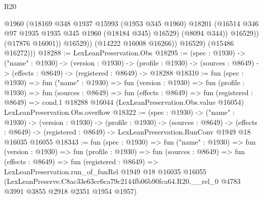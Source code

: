 \begin{lexlean}{R20}
\begin{coremodule}
                      @1960
                      (@18169
                        @348
                        @1937
                        @15993
                        (@1953 @345 @1960)
                        @18201
                        (@16514 @346 @97 @1935 @1935 @345 @1960 (@18184 @345) @16529)
                        (@8094 @344))
                      @16529))
                  (@17876 @16001))
                @16529))
            (@14222 @16008 @16266))
          @16529)
        (@15486 @16272)))
@18288 := LexLeanPreservation.Obs
@18295 := (spec : @1930) ->
  ("name" : @1930) ->
  (version : @1930) ->
  (profile : @1930) -> (sources : @8649) -> (effects : @8649) -> (registered : @8649) -> @18288
@18310 := fun (spec : @1930) =>
  fun ("name" : @1930) =>
  fun (version : @1930) =>
  fun (profile : @1930) =>
  fun (sources : @8649) =>
  fun (effects : @8649) =>
  fun (registered : @8649) =>
  cond.{1} @18288 @16044 (LexLeanPreservation.Obs.value @16054) LexLeanPreservation.Obs.overflow
@18322 := (spec : @1930) ->
  ("name" : @1930) ->
  (version : @1930) ->
  (profile : @1930) ->
  (sources : @8649) ->
  (effects : @8649) -> (registered : @8649) -> LexLeanPreservation.RunConv @1949 @18 @16035 @16055
@18343 := fun (spec : @1930) =>
  fun ("name" : @1930) =>
  fun (version : @1930) =>
  fun (profile : @1930) =>
  fun (sources : @8649) =>
  fun (effects : @8649) =>
  fun (registered : @8649) =>
  LexLeanPreservation.run_of_funRel
    @1949
    @18
    @16035
    @16055
    (LexLeanPreserve.C8ac33e63cc6ca79c2144fb06b90fca64.R20.__rel_0
      @4783
      @3991
      @3855
      @2918
      @2351
      @1954
      @1957)
\end{coremodule}
\end{lexlean}

